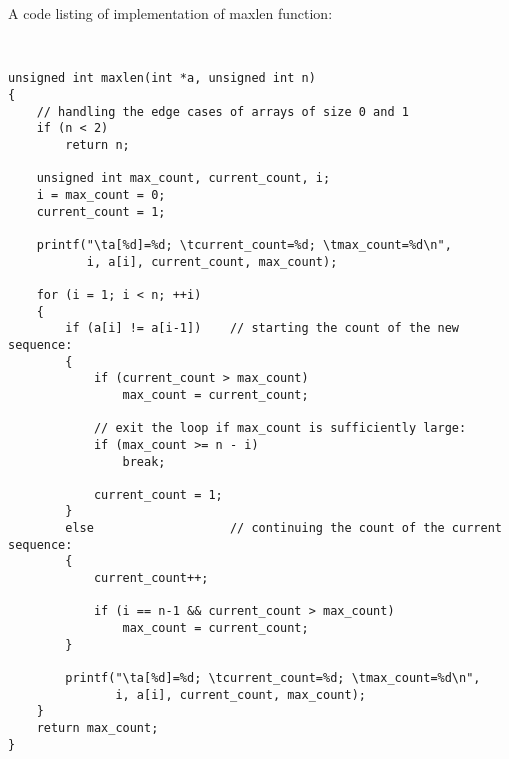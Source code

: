 \documentclass{article}
\begin{document}
\paragraph{}\
\paragraph{}\
\paragraph{}\
\paragraph{}\
\paragraph{}\
\paragraph{}\
\paragraph{}\
\paragraph{}\


\noindent A code listing of implementation of maxlen function:
	\ttfamily
	
\begin{verbatim} 


unsigned int maxlen(int *a, unsigned int n)
{
    // handling the edge cases of arrays of size 0 and 1
    if (n < 2)                                      
        return n;

    unsigned int max_count, current_count, i;
    i = max_count = 0;
    current_count = 1;

    printf("\ta[%d]=%d; \tcurrent_count=%d; \tmax_count=%d\n",
           i, a[i], current_count, max_count);

    for (i = 1; i < n; ++i)
    {
        if (a[i] != a[i-1])    // starting the count of the new sequence:
        {
            if (current_count > max_count)
                max_count = current_count;
                
            // exit the loop if max_count is sufficiently large:
            if (max_count >= n - i)                 
                break;
                
            current_count = 1;
        }
        else                   // continuing the count of the current sequence:
        {
            current_count++;
            
            if (i == n-1 && current_count > max_count)
                max_count = current_count;
        }

        printf("\ta[%d]=%d; \tcurrent_count=%d; \tmax_count=%d\n",
               i, a[i], current_count, max_count);
    }
    return max_count;
}


\end{verbatim}	
	
\end{document}
